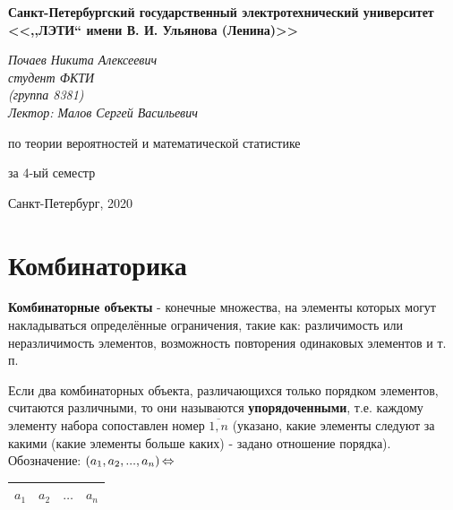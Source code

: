 


\thispagestyle{empty}
\begin{center}
	\textbf{Санкт-Петербургский государственный электротехнический университет \\ <<,,\hspace{0.5pt}ЛЭТИ\hspace{0.5pt}`` имени В. И. Ульянова (Ленина)>>}
\end{center}
\vspace{13ex}
\begin{flushright} %
	\noindent %
	\textit{Почаев Никита Алексеевич}
	\\
	\textit{студент ФКТИ \\(группа 8381)}
	\\
	\textit{Лектор: Малов Сергей Васильевич}
\end{flushright}
\begin{center}
	\vspace{13ex}
	\vspace{1ex}
	
	по теории вероятностей и математической статистике
	
	
	за 4-ый семестр
	
	
	\vfill %
	{\small Санкт-Петербург, 2020}
\end{center}
\newpage

\tableofcontents

\newpage

\section{Комбинаторика}

\textbf{Комбинаторные объекты} - конечные множества, на элементы которых могут накладываться определённые ограничения, такие как: различимость или неразличимость элементов, возможность повторения одинаковых элементов и т. п.

Если два комбинаторных объекта, различающихся только порядком элементов, считаются различными, то они называются \textbf{упорядоченными}, т.е. каждому элементу набора сопоставлен номер $\overline{1,n}$ (указано, какие элементы следуют за какими (какие элементы больше каких) - задано отношение порядка).
Обозначение: $(a_1, a_2, ..., a_n) \operatorname{\Leftrightarrow} $
\begin{table}[h]
	\begin{tabular}{|l|l|l|l|}
		$a_1$ & $a_2$ & $\dots$ & $a_n$ \\ \hline
	\end{tabular}
\end{table}

